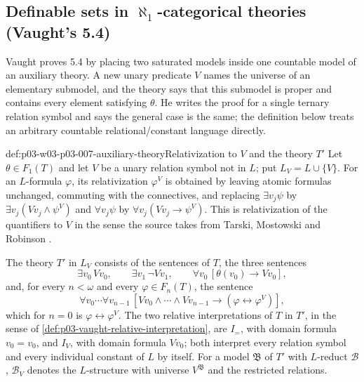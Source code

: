 \subsection{Definable sets in \(\aleph_1\)-categorical theories (Vaught's 5.4)}
\label{sec:p03-w03-p03-007-definable}

Vaught proves 5.4 by placing two saturated models inside one countable model
of an auxiliary theory. A new unary predicate \(V\) names the universe of an
elementary submodel, and the theory says that this submodel is proper and
contains every element satisfying \(\theta\). He writes the proof for a
single ternary relation symbol and says the general case is the same; the
definition below treats an arbitrary countable relational/constant
language directly.

\begin{hbdefinition}{def:p03-w03-p03-007-auxiliary-theory}{Relativization to \(V\) and the theory \(T'\)}
Let \(\theta\in F_1(T)\) and let \(V\) be a unary relation symbol not in
\(L\); put \(L_V=L\cup\{V\}\). For an \(L\)-formula \(\varphi\), its
relativization \(\varphi^V\) is obtained by leaving atomic formulas
unchanged, commuting with the connectives, and replacing
\(\exists v_j\psi\) by \(\exists v_j(Vv_j\land\psi^V)\) and
\(\forall v_j\psi\) by \(\forall v_j(Vv_j\to\psi^V)\).
This is relativization of the quantifiers to \(V\) in the sense
the source takes from Tarski, Mostowski and Robinson
\cite[p.~317, n.~21]{Vaught1961}.

The theory \(T'\) in \(L_V\) consists of the sentences of \(T\), the three
sentences
\[
 \exists v_0\,Vv_0,\qquad
 \exists v_1\,\neg Vv_1,\qquad
 \forall v_0\,[\theta(v_0)\to Vv_0],
 \tag{1}
\]
and, for every \(n<\omega\) and every \(\varphi\in F_n(T)\), the sentence
\[
 \forall v_0\cdots\forall v_{n-1}\,
 [Vv_0\land\cdots\land Vv_{n-1}\to(\varphi\leftrightarrow\varphi^V)],
 \tag{2}
\]
which for \(n=0\) is \(\varphi\leftrightarrow\varphi^V\).
The two relative interpretations of \(T\) in \(T'\), in the sense of
\cref{def:p03-vaught-relative-interpretation}, are \(I_=\), with domain
formula \(v_0=v_0\), and \(I_V\), with domain formula \(Vv_0\); both
interpret every relation symbol and every individual constant of \(L\) by
itself. For a model \(\mathfrak B\) of \(T'\) with \(L\)-reduct
\(\mathcal B\), \(\mathcal B_V\) denotes the \(L\)-structure with universe
\(V^{\mathfrak B}\) and the restricted relations.
\end{hbdefinition}

